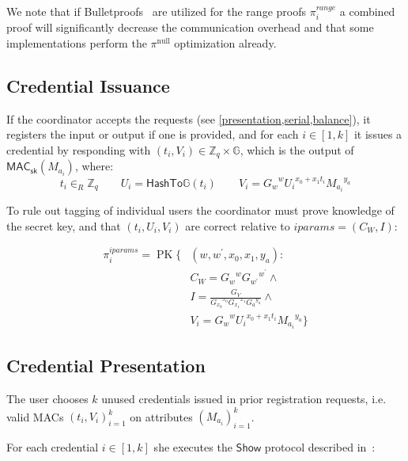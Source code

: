 \documentclass[a4paper]{article}
\begin{document}
We note that if Bulletproofs~\cite{bunz2018bulletproofs} are utilized for the range proofs $\pi^{\textit{range}}_i$ a combined proof will significantly decrease the communication overhead and that some implementations perform the $\pi^{\mathrm{null}}$ optimization already.

\subsection{Credential Issuance}

If the coordinator accepts the requests (see \cref{presentation,serial,balance}), it registers the input or output if one is provided, and for each $i \in [1,k]$ it issues a credential by responding with
$(t_i, V_i) \in \mathbb{Z}_q \times \mathbb{G}$,
which is the output of
$\mathsf{MAC}_{\mathsf{sk}}(M_{a_i})$,
where:
\[
  t_i \in_{R} \mathbb{Z}_{q}
  \qquad
  U_i = \mathsf{HashTo\mathbb{G}}(t_i)
  \qquad
  V_i={G_w}^{w} {U_i}^{x_{0}+x_{1} t_i}{M_{a_i}}^{y_a}
\]


To rule out tagging of individual users the coordinator must prove knowledge of the secret key, and that $(t_i, U_i, V_i)$ are correct relative to $\mathit{iparams}=(C_{W}, I)$:

\begin{align*}
  \pi_{i}^{\mathit{iparams}}=\operatorname{PK}\{ & (w, w^{\prime}, x_{0}, x_{1}, y_a): \\
                                                 &C_{W}={G_{w}}^{w} {G_{w^{\prime}}}^{w^\prime} \land \\
                                                 &I=\frac{G_{V}}{{G_{x_{0}}}^{x_0} {G_{x_1}}^{x_1} {G_a}^{y_a}}  \land \\
                                                 &V_i={G_w}^{w}{U_i}^{x_{0}+x_{1}t_i} {M_{a_i}}^{y_a}
                                                   \}
\end{align*}

\subsection{Credential Presentation}\label{presentation}

The user chooses $k$ unused credentials issued in prior registration requests, i.e. valid MACs $(t_i,V_i)_{i=1}^k$ on attributes $(M_{a_i})_{i=1}^k$.

For each credential $i \in [1, k]$ she executes the $\mathsf{Show}$ protocol described in~\cite{chase2019signal}:
\end{document}
